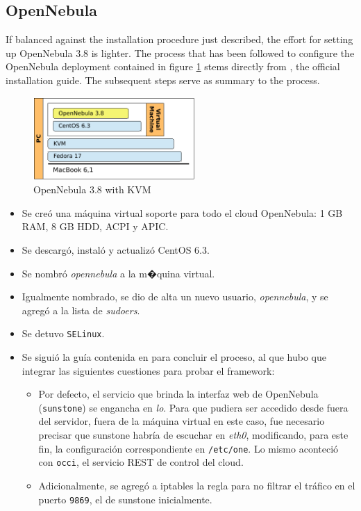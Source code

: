\subsection{OpenNebula}\label{subsec:opennebula}

\noindent If balanced against the installation procedure just described, the effort for setting up OpenNebula 3.8 is lighter. The process that has been followed to configure the OpenNebula deployment contained in figure \ref{fig:opennebula} stems directly from \cite{centosonquickstart}, the official installation guide. The subsequent steps serve as summary to the process.

\begin{figure}[tbp]
\begin{center}
\includegraphics[width=0.55\textwidth]{imagenes/009.pdf}
 \caption{OpenNebula 3.8 with KVM}
\label{fig:opennebula}
\end{center}
\end{figure}

\begin{itemize}
 \item Se cre\'o una m\'aquina virtual soporte para todo el cloud OpenNebula: 1 GB RAM, 8 GB HDD, ACPI y APIC.
 \item Se descarg\'o, instal\'o y actualiz\'o CentOS 6.3.
 \item Se nombr\'o \emph{opennebula} a la m�quina virtual.
 \item Igualmente nombrado, se dio de alta un nuevo usuario, \emph{opennebula}, y se agreg\'o a la lista de \emph{sudoers}.
 \item Se detuvo \texttt{SELinux}.
 \item Se sigui\'o la gu\'ia contenida en \cite{centosonquickstart} para concluir el proceso, al que hubo que integrar las siguientes cuestiones para probar el framework:
  \begin{itemize}
   \item Por defecto, el servicio que brinda la interfaz web de OpenNebula (\texttt{sunstone}) se engancha en \emph{lo}. Para que pudiera ser accedido desde fuera del servidor, fuera de la m\'aquina virtual en este caso, fue necesario precisar que sunstone habr\'ia de escuchar en \emph{eth0}, modificando, para este fin, la configuraci\'on correspondiente en \texttt{/etc/one}. Lo mismo aconteci\'o con \texttt{occi}, el servicio REST de control del cloud.
   \item Adicionalmente, se agreg\'o a iptables la regla para no filtrar el tr\'afico en el puerto \texttt{9869}, el de sunstone inicialmente.
  \end{itemize}
\end{itemize}


